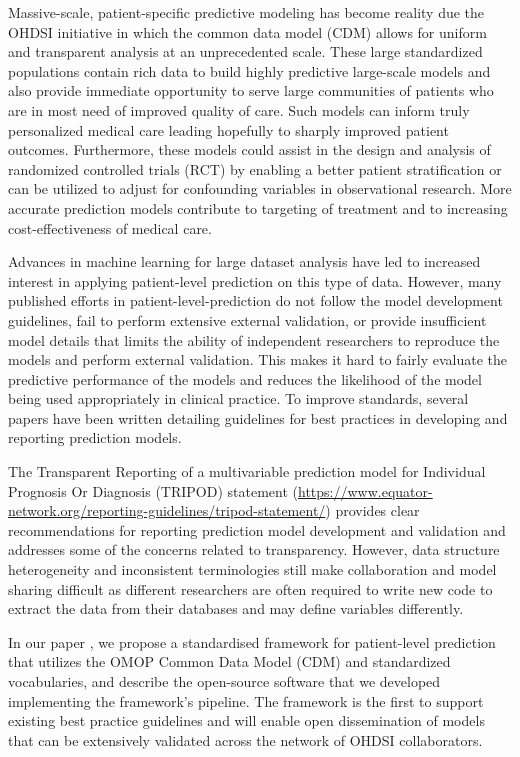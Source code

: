 \documentclass[]{book}
\begin{document}
Massive-scale, patient-specific predictive modeling has become reality
due the OHDSI initiative in which the common data model (CDM) allows for
uniform and transparent analysis at an unprecedented scale. These large
standardized populations contain rich data to build highly predictive
large-scale models and also provide immediate opportunity to serve large
communities of patients who are in most need of improved quality of
care. Such models can inform truly personalized medical care leading
hopefully to sharply improved patient outcomes. Furthermore, these
models could assist in the design and analysis of randomized controlled
trials (RCT) by enabling a better patient stratification or can be
utilized to adjust for confounding variables in observational research.
More accurate prediction models contribute to targeting of treatment and
to increasing cost-effectiveness of medical care.

Advances in machine learning for large dataset analysis have led to
increased interest in applying patient-level prediction on this type of
data. However, many published efforts in patient-level-prediction do not
follow the model development guidelines, fail to perform extensive
external validation, or provide insufficient model details that limits
the ability of independent researchers to reproduce the models and
perform external validation. This makes it hard to fairly evaluate the
predictive performance of the models and reduces the likelihood of the
model being used appropriately in clinical practice. To improve
standards, several papers have been written detailing guidelines for
best practices in developing and reporting prediction models.

The Transparent Reporting of a multivariable prediction model for
Individual Prognosis Or Diagnosis (TRIPOD) statement
(\url{https://www.equator-network.org/reporting-guidelines/tripod-statement/})
provides clear recommendations for reporting prediction model
development and validation and addresses some of the concerns related to
transparency. However, data structure heterogeneity and inconsistent
terminologies still make collaboration and model sharing difficult as
different researchers are often required to write new code to extract
the data from their databases and may define variables differently.

In our paper \citet{reps2018}, we propose a standardised framework for
patient-level prediction that utilizes the OMOP Common Data Model (CDM)
and standardized vocabularies, and describe the open-source software
that we developed implementing the framework's pipeline. The framework
is the first to support existing best practice guidelines and will
enable open dissemination of models that can be extensively validated
across the network of OHDSI collaborators.
\end{document}

